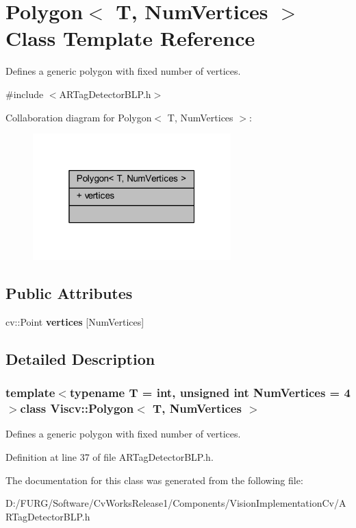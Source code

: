 \hypertarget{class_viscv_1_1_polygon}{}\section{Polygon$<$ T, Num\+Vertices $>$ Class Template Reference}
\label{class_viscv_1_1_polygon}


Defines a generic polygon with fixed number of vertices.  




{\ttfamily \#include $<$A\+R\+Tag\+Detector\+B\+L\+P.\+h$>$}



Collaboration diagram for Polygon$<$ T, Num\+Vertices $>$\+:
\nopagebreak
\begin{figure}[H]
\begin{center}
\leavevmode
\includegraphics[width=217pt]{class_viscv_1_1_polygon__coll__graph}
\end{center}
\end{figure}
\subsection*{Public Attributes}
\begin{DoxyCompactItemize}
\item 
\hypertarget{class_viscv_1_1_polygon_a7105617746f6d9e171b22ea4a859e77f}{}cv\+::\+Point {\bfseries vertices} \mbox{[}Num\+Vertices\mbox{]}\label{class_viscv_1_1_polygon_a7105617746f6d9e171b22ea4a859e77f}

\end{DoxyCompactItemize}


\subsection{Detailed Description}
\subsubsection*{template$<$typename T = int, unsigned int Num\+Vertices = 4$>$class Viscv\+::\+Polygon$<$ T, Num\+Vertices $>$}

Defines a generic polygon with fixed number of vertices. 

Definition at line 37 of file A\+R\+Tag\+Detector\+B\+L\+P.\+h.



The documentation for this class was generated from the following file\+:\begin{DoxyCompactItemize}
\item 
D\+:/\+F\+U\+R\+G/\+Software/\+Cv\+Works\+Release1/\+Components/\+Vision\+Implementation\+Cv/A\+R\+Tag\+Detector\+B\+L\+P.\+h\end{DoxyCompactItemize}
